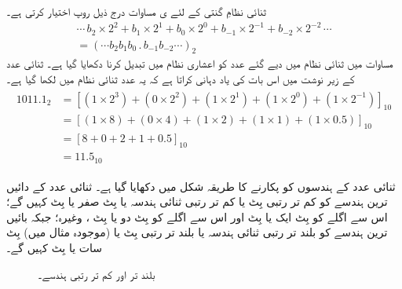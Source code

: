 	 ثنائی نظامِ گنتی کے لئے ی مساوات  درج ذیل روپ اختیار کرتی ہے۔
\begin{multline}\label{مساوات_ثنائی_عمومی_روپ_ثنائی}
\cdots\, b_2\times 2^2+b_1\times 2^1+b_0\times 2^0+b_{-1}\times 2^{-1}+b_{-2}\times 2^{-2}\,\cdots\\
=(\cdots b_2b_1b_0\, .\, b_{-1}b_{-2}\cdots)_{2}
\end{multline}
	مساوات  میں ثنائی نظام میں دیے گئے عدد کو اعشاری نظام میں تبدیل کرنا دکھایا گیا ہے۔ ثنائی عدد کے زیر نوشت میں  اس بات کی یاد دہانی کراتا ہے کہ یہ عدد ثنائی نظام میں لکھا گیا ہے۔
\begin{gather} 
\begin{aligned}\label{مساوات_ثنائی_مثال}
1011.1_2&=[(1\times 2^3)+(0\times 2^2)+(1\times 2^1)+(1\times 2^0)+(1\times 2^{-1})]_{10}\\
&=[(1\times 8)+(0\times 4)+(1\times 2)+(1\times 1)+(1\times 0.5)]_{10}\\
&=[8+0+2+1+0.5]_{10}\\
&=11.5_{10}
\end{aligned}
\end{gather}
	
 ثنائی عدد کے ہندسوں کو پکارنے کا طریقہ شکل  میں دکھایا گیا ہے۔ ثنائی عدد کے دائیں ترین ہندسے کو کم تر رتبی بِٹ یا کم تر رتبی ثنائی ہندسہ یا بِٹ صفر یا بِٹ  کہیں گے؛ اس سے اگلے کو بِٹ ایک یا بِٹ  اور اس سے اگلے کو بِٹ دو یا بِٹ ، وغیرہ؛ جبکہ بائیں ترین ہندسے کو بلند تر رتبی ثنائی ہندسہ یا بلند تر رتبی بِٹ یا (موجودہ مثال میں) بِٹ سات یا بِٹ  کہیں گے۔

\begin{figure}
\centering
{}
\caption{بلند تر اور کم تر رتبی ہندسے۔}
\label{شکل_ثنائی_رتبہ_ہندسہ}
\end{figure}

